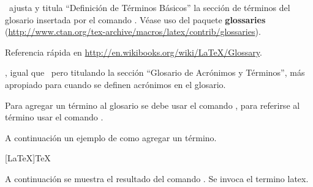 

\ ajusta y titula ``Definición de Términos Básicos'' la sección de términos del glosario insertada por el comando . Véase uso del paquete \textbf{glossaries} (\url{http://www.ctan.org/tex-archive/macros/latex/contrib/glossaries}).

Referencia rápida en \url{http://en.wikibooks.org/wiki/LaTeX/Glossary}.

, igual que \ pero titulando la sección ``Glosario de Acrónimos y Términos'', más apropiado para cuando se definen acrónimos en el glosario.

Para agregar un término al glosario se debe usar el comando , 
para referirse al término usar el comando . 

A continuación un ejemplo de como agregar un término.

\begin{listado}{[LaTeX]TeX}
\end{listado}

A continuación se muestra el resultado del comando . Se invoca el termino \gls{latex}.

\hacerglosario